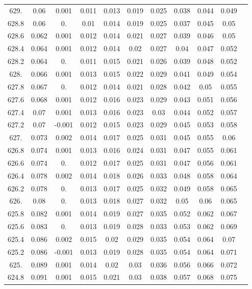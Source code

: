 \documentclass[12pt]{ctexart}
\numberwithin{equation}{section}
\begin{document}
\begin{longtable}{ccccccccccc}
629.	&	0.06	&	0.001	&	0.011	&	0.013	&	0.019	&	0.025	&	0.038	&	0.044	&	0.049	\\
628.8	&	0.06	&	0.	&	0.01	&	0.014	&	0.019	&	0.025	&	0.037	&	0.045	&	0.05	\\
628.6	&	0.062	&	0.001	&	0.012	&	0.014	&	0.021	&	0.027	&	0.039	&	0.046	&	0.05	\\
628.4	&	0.064	&	0.001	&	0.012	&	0.014	&	0.02	&	0.027	&	0.04	&	0.047	&	0.052	\\
628.2	&	0.064	&	0.	&	0.011	&	0.015	&	0.021	&	0.026	&	0.039	&	0.048	&	0.052	\\
628.	&	0.066	&	0.001	&	0.013	&	0.015	&	0.022	&	0.029	&	0.041	&	0.049	&	0.054	\\
627.8	&	0.067	&	0.	&	0.012	&	0.014	&	0.021	&	0.028	&	0.042	&	0.05	&	0.055	\\
627.6	&	0.068	&	0.001	&	0.012	&	0.016	&	0.023	&	0.029	&	0.043	&	0.051	&	0.056	\\
627.4	&	0.07	&	0.001	&	0.013	&	0.016	&	0.023	&	0.03	&	0.044	&	0.052	&	0.057	\\
627.2	&	0.07	&	-0.001	&	0.012	&	0.015	&	0.023	&	0.029	&	0.045	&	0.053	&	0.058	\\
627.	&	0.073	&	0.002	&	0.014	&	0.017	&	0.025	&	0.031	&	0.045	&	0.055	&	0.06	\\
626.8	&	0.074	&	0.001	&	0.013	&	0.016	&	0.024	&	0.031	&	0.047	&	0.055	&	0.061	\\
626.6	&	0.074	&	0.	&	0.012	&	0.017	&	0.025	&	0.031	&	0.047	&	0.056	&	0.061	\\
626.4	&	0.078	&	0.002	&	0.014	&	0.018	&	0.026	&	0.033	&	0.048	&	0.058	&	0.064	\\
626.2	&	0.078	&	0.	&	0.013	&	0.017	&	0.025	&	0.032	&	0.049	&	0.058	&	0.065	\\
626.	&	0.08	&	0.	&	0.013	&	0.018	&	0.027	&	0.032	&	0.05	&	0.06	&	0.065	\\
625.8	&	0.082	&	0.001	&	0.014	&	0.019	&	0.027	&	0.035	&	0.052	&	0.062	&	0.067	\\
625.6	&	0.083	&	0.	&	0.013	&	0.019	&	0.028	&	0.033	&	0.053	&	0.062	&	0.069	\\
625.4	&	0.086	&	0.002	&	0.015	&	0.02	&	0.029	&	0.035	&	0.054	&	0.064	&	0.07	\\
625.2	&	0.086	&	-0.001	&	0.013	&	0.019	&	0.028	&	0.035	&	0.054	&	0.064	&	0.071	\\
625.	&	0.089	&	0.001	&	0.014	&	0.02	&	0.03	&	0.036	&	0.056	&	0.066	&	0.072	\\
624.8	&	0.091	&	0.001	&	0.015	&	0.021	&	0.03	&	0.038	&	0.057	&	0.068	&	0.075	\\

\end{longtable}
\end{document}
